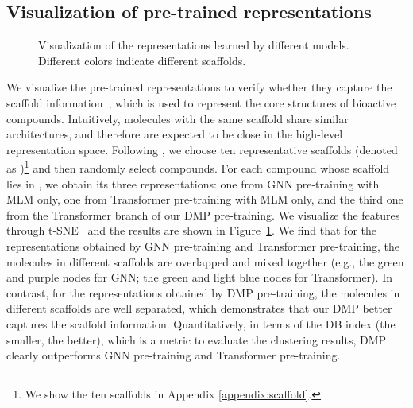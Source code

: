 \documentclass{article}
\newcommand{\ourM}{DMP}
\begin{document}
\subsection{Visualization of pre-trained representations}
\begin{figure}[!htpb]
\centering
\begin{minipage}{0.33\linewidth}
\end{minipage}\begin{minipage}{0.33\linewidth}
\end{minipage}\begin{minipage}{0.33\linewidth}
\subfigure[\ourM{}: DB Index 2.19]{
\texttt{[image: db\_dmp.pdf]}
}
\end{minipage}
\caption{Visualization of the representations learned by different models. Different colors indicate different scaffolds.}
\label{fig:viz_different_models_by_scaffold}
\end{figure}
We visualize the pre-trained representations to verify whether they capture the scaffold information~\cite{hu2016scaffold}, which is used to represent the core structures of bioactive compounds. Intuitively, molecules with the same scaffold share similar architectures, and therefore are expected to be close in the high-level representation space. Following \cite{li2020learn}, we choose ten representative scaffolds (denoted as )\footnote{We show the ten scaffolds in Appendix \ref{appendix:scaffold}. } and then randomly select  compounds.
For each compound whose scaffold lies in , we obtain its three representations: one from GNN pre-training with MLM only, one from Transformer pre-training with MLM only, and the third one from the  Transformer branch of our \ourM{} pre-training. We visualize the features through t-SNE~\cite{van2008visualizing} and the results are shown in Figure~\ref{fig:viz_different_models_by_scaffold}. We find that for the representations obtained by GNN pre-training and Transformer pre-training,   the molecules in different scaffolds  are overlapped and mixed together (e.g., the green and purple nodes for GNN; the green and light blue nodes for Transformer). In contrast, for the representations obtained by \ourM{} pre-training, the molecules in different scaffolds are well separated, which demonstrates that our \ourM{} better captures the scaffold information. Quantitatively, in terms of the DB index \citep{davies1979cluster} (the smaller, the better), which is a metric to evaluate the clustering results, \ourM{} clearly outperforms GNN pre-training and Transformer pre-training.
\end{document}
